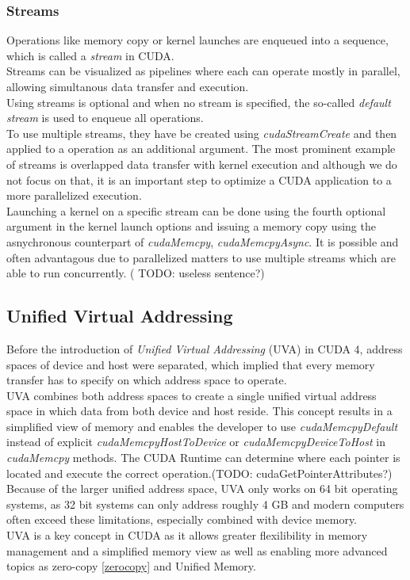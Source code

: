 \subsubsection{Streams}
\label{streams}
Operations like memory copy or kernel launches are enqueued into a sequence, which is called a \emph{stream} in CUDA.\\
Streams can be visualized as pipelines where each can operate mostly in parallel, allowing simultanous data transfer and execution.\\
Using streams is optional and when no stream is specified, the so-called \emph{default stream} is used to enqueue all operations.\\
To use multiple streams, they have be created using \emph{cudaStreamCreate} and then applied to a operation as an additional argument.
The most prominent example of streams is overlapped data transfer with kernel execution
and although we do not focus on that, it is an important step to optimize a CUDA application to a more parallelized execution.\\
Launching a kernel on a specific stream can be done using the fourth optional argument in the kernel launch options and
issuing a memory copy using the asnychronous counterpart of \emph{cudaMemcpy}, \emph{cudaMemcpyAsync}.
It is possible and often advantagous due to parallelized matters to use multiple streams which are able to run concurrently. ( TODO: useless sentence?)\\
\subsection{Unified Virtual Addressing}
\label{uva}
Before the introduction of \emph{Unified Virtual Addressing} (UVA) in CUDA 4, address spaces of device and host were separated, which implied that every memory transfer has to specify on which address space to operate.\\
UVA combines both address spaces to create a single unified virtual address space in which data from both device and host reside. This concept results in a simplified view of memory and enables the developer to use \emph{cudaMemcpyDefault} instead of explicit \emph{cudaMemcpyHostToDevice} or \emph{cudaMemcpyDeviceToHost} in \emph{cudaMemcpy} methods.
The CUDA Runtime can determine where each pointer is located and execute the correct operation.(TODO: cudaGetPointerAttributes?)
Because of the larger unified address space, UVA only works on 64 bit operating systems, as 32 bit systems can only address roughly 4 GB and modern computers often exceed these limitations, especially combined with device memory.\\
UVA is a key concept in CUDA as it allows greater flexilibility in memory management and a simplified memory view
as well as enabling more advanced topics as zero-copy \ref{zerocopy} and Unified Memory.
